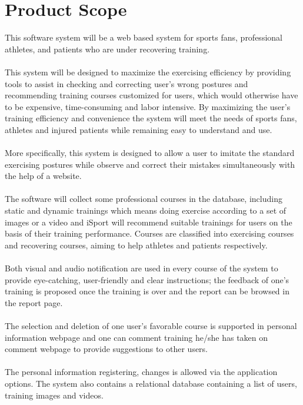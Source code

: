 \documentclass[16pt]{scrreprt}
\begin{document}
\section{Product Scope}
This software system will be a web based system for sports fans, professional athletes, and patients who are under recovering training. \\
\\
This system will be designed to maximize the exercising efficiency by providing tools to assist in checking and correcting user's wrong postures and recommending training courses customized for users, which would otherwise have to be expensive, time-consuming and labor intensive. By maximizing the user’s training efficiency and convenience the system will meet the needs of sports fans, athletes and injured patients while remaining easy to understand and use.\\
\\
More specifically, this system is designed to allow a user to imitate the standard exercising postures while observe and correct their mistakes simultaneously with the help of a website. \\
\\
The software will collect some professional courses in the database, including static and dynamic trainings which means doing exercise according to a set of images or a video and iSport will recommend suitable trainings for users on the basis of their training performance. Courses are classified into exercising courses and recovering courses, aiming to help athletes and patients respectively.\\
\\
Both visual and audio notification are used in every course of the system to provide eye-catching, user-friendly and clear instructions; the feedback of one's training is proposed once the training is over and the report can be browsed in the report page.\\
\\
The selection and deletion of one user's favorable course is supported in personal information webpage and one can comment training he/she has taken on comment webpage to provide suggestions to other users.\\
\\
 The personal information registering, changes is allowed via the application options. The system also contains a relational database containing a list of users, training images and videos.
 
\end{document}
